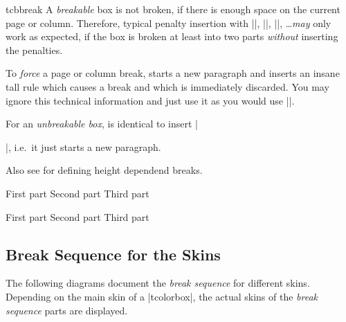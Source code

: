 \begin{docCommand}[doc new=2017-07-05]{tcbbreak}{}
  A \emph{breakable} box is not broken, if there is enough
  space on the current page or column.
  Therefore, typical penalty insertion with
  |\break|, |\pagebreak|, |\columnbreak|, \ldots \emph{may} only work as
  expected, if the box is broken at least into two parts
  \emph{without} inserting the penalties.\par\smallskip
  To \emph{force} a page or column break, 
  starts a new paragraph and inserts an insane tall rule which causes a
  break and which is immediately discarded. You may ignore this technical
  information and just use it as you would use |\pagebreak|.\par\smallskip
  For an \emph{unbreakable box},  is identical to insert |\par|,
  i.e.\ it just starts a new paragraph.\par\smallskip
  Also see  for defining height dependend breaks.

\begin{dispListing}
\begin{multicols}{3}
  \begin{tcolorbox}[breakable,enhanced jigsaw,size=small,
    colback=red!5!white,colframe=red!75!black,fonttitle=\bfseries,
    title=Break into parts
  ]
  First part\tcbbreak
  Second part\tcbbreak
  Third part
  \end{tcolorbox}
\end{multicols}

\begin{multicols}{3}
  \begin{tcolorbox}[enhanced jigsaw,size=small,
    colback=red!5!white,colframe=red!75!black,fonttitle=\bfseries,
    title=You shall not break
  ]
  First part\tcbbreak
  Second part\tcbbreak
  Third part
  \end{tcolorbox}
\end{multicols}

\end{dispListing}
{\tcbusetemp}

\end{docCommand}



\clearpage
\subsection{Break Sequence for the Skins}\label{subsec:breaksequence}
The following diagrams document the \emph{break sequence} for different
skins. Depending on the main skin of a |tcolorbox|, the actual skins of
the \emph{break sequence} parts are displayed.

